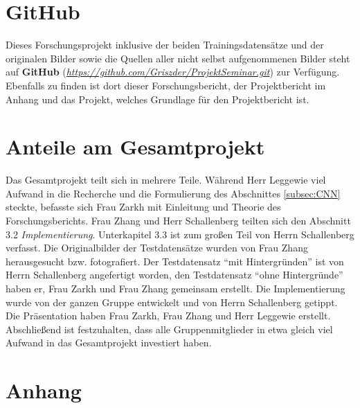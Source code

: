 \documentclass[paper=A4,pagesize=auto,12pt,headinclude=true,footinclude=true,BCOR=0mm,DIV=calc]{scrartcl}
\newcommand{\sectionspace}{
	\vspace{0.5cm}
}
\renewcommand{\listoffigures}{\begingroup
	\tocsection
	\tocfile{\listfigurename}{lof}
	\endgroup}
\renewcommand{\listoftables}{\begingroup
	\tocsection
	\tocfile{\listtablename}{lot}
	\endgroup}
\begin{document}
\newpage
\sectionspace
\section{GitHub}
Dieses Forschungsprojekt inklusive der beiden Trainingsdatensätze und der originalen Bilder sowie die Quellen aller nicht selbst aufgenommenen Bilder steht auf \textbf{GitHub} (\hyperref{https://github.com/Griszder/ProjektSeminar.git}{}{}{\textit{https://github.com/Griszder/ProjektSeminar.git}}) zur Verfügung. Ebenfalls zu finden ist dort dieser Forschungsbericht, der Projektbericht im Anhang und das Projekt, welches Grundlage für den Projektbericht ist.

\sectionspace
\section{Anteile am Gesamtprojekt}
Das Gesamtprojekt teilt sich in mehrere Teile. Während Herr Leggewie viel Aufwand in die Recherche und die Formulierung des Abschnittes \ref{subsec:CNN} steckte, befasste sich Frau Zarkh mit Einleitung und Theorie des Forschungsberichts. Frau Zhang und Herr Schallenberg teilten sich den Abschnitt 3.2 \textit{Implementierung}. Unterkapitel 3.3 ist zum großen Teil von Herrn Schallenberg verfasst. Die Originalbilder der Testdatensätze wurden von Frau Zhang herausgesucht bzw. fotografiert. Der Testdatensatz ``mit Hintergründen'' ist von Herrn Schallenberg angefertigt worden, den Testdatensatz ``ohne Hintergründe'' haben er, Frau Zarkh und Frau Zhang gemeinsam erstellt. Die Implementierung wurde von der ganzen Gruppe entwickelt und von Herrn Schallenberg getippt. Die Präsentation haben Frau Zarkh, Frau Zhang und Herr Leggewie erstellt.\\
Abschließend ist festzuhalten, dass alle Gruppenmitglieder in etwa gleich viel Aufwand in das Gesamtprojekt investiert haben.

\newpage
\printbibliography[heading=bibnumbered]

\sectionspace
\listoffigures
\sectionspace
\listoftables

\sectionspace
\section{Anhang}
\end{document}
